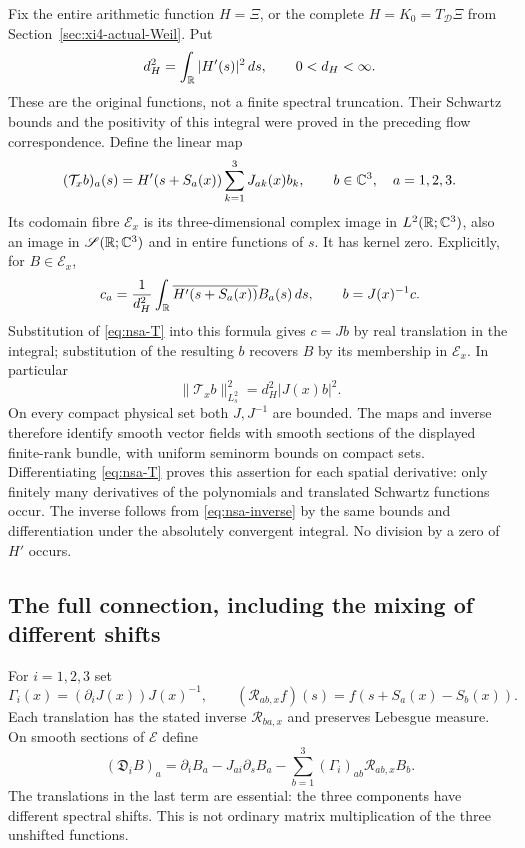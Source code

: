 Fix the entire arithmetic function \(H=\Xi\), or the complete
\(H=K_0=T_{\mathcal D}\Xi\) from
Section~\ref{sec:xi4-actual-Weil}. Put
\[
 d_H^2=\int_{\mathbb R}|H'(s)|^2\,ds,\qquad 0<d_H<\infty .
\]
These are the original functions, not a finite spectral truncation.
Their Schwartz bounds and the positivity of this integral were proved
in the preceding flow correspondence. Define the linear map
\begin{equation}\label{eq:nsa-T}
 (\mathcal T_x b)_a(s)=H'(s+S_a(x))\sum_{k=1}^3J_{ak}(x)b_k,
 \qquad b\in\mathbb C^3,\quad a=1,2,3 .
\end{equation}
Its codomain fibre \(\mathcal E_x\) is its three-dimensional complex
image in \(L^2(\mathbb R;\mathbb C^3)\), also an image in
\(\mathscr S(\mathbb R;\mathbb C^3)\) and in entire functions of \(s\).
It has kernel zero. Explicitly, for \(B\in\mathcal E_x\),
\begin{equation}\label{eq:nsa-inverse}
 c_a=\frac1{d_H^2}\int_{\mathbb R}
             \overline{H'(s+S_a(x))}B_a(s)\,ds,\qquad
 b=J(x)^{-1}c .
\end{equation}
Substitution of \eqref{eq:nsa-T} into this formula gives \(c=Jb\)
by real translation in the integral; substitution of the resulting
\(b\) recovers \(B\) by its membership in \(\mathcal E_x\).
In particular
\begin{equation}\label{eq:nsa-norm}
 \|\mathcal T_xb\|_{L^2_s}^2=d_H^2|J(x)b|^2 .
\end{equation}
On every compact physical set both \(J,J^{-1}\) are bounded.
The maps and inverse therefore identify smooth vector fields with
smooth sections of the displayed finite-rank bundle, with uniform
seminorm bounds on compact sets. Differentiating
\eqref{eq:nsa-T} proves this assertion for each spatial derivative:
only finitely many derivatives of the polynomials and translated
Schwartz functions occur. The inverse follows from
\eqref{eq:nsa-inverse} by the same bounds and differentiation under
the absolutely convergent integral. No division by a zero of \(H'\)
occurs.

\subsection{The full connection, including the mixing of different shifts}

For \(i=1,2,3\) set
\[
 \Gamma_i(x)=(\partial_iJ(x))J(x)^{-1},\qquad
 (\mathcal R_{ab,x}f)(s)=f(s+S_a(x)-S_b(x)).
\]
Each translation has the stated inverse
\(\mathcal R_{ba,x}\) and preserves Lebesgue measure. On smooth
sections of \(\mathcal E\) define
\begin{equation}\label{eq:nsa-connection}
 (\mathfrak D_iB)_a
 =\partial_iB_a-J_{ai}\partial_sB_a
                 -\sum_{b=1}^3(\Gamma_i)_{ab}\mathcal R_{ab,x}B_b .
\end{equation}
The translations in the last term are essential: the three components
have different spectral shifts. This is not ordinary matrix
multiplication of the three unshifted functions.

